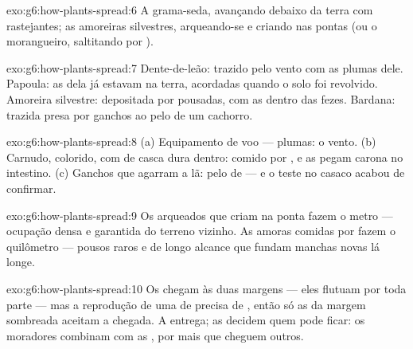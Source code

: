 \begin{solution}{exo:g6:how-plants-spread:6}
A grama-seda, avançando debaixo da terra com  rastejantes; as
amoreiras silvestres, arqueando-se e criando  nas pontas (ou o
morangueiro, saltitando por ).
\end{solution}

\begin{solution}{exo:g6:how-plants-spread:7}
Dente-de-leão: trazido pelo vento com as plumas dele. Papoula: as
 dela já estavam na terra, acordadas quando o solo foi
revolvido. Amoreira silvestre: depositada por  pousadas, com as
 dentro das fezes. Bardana: trazida presa por ganchos ao pelo
de um cachorro.
\end{solution}

\begin{solution}{exo:g6:how-plants-spread:8}
(a) Equipamento de voo --- plumas: o vento. (b) Carnudo, colorido, com
 de casca dura dentro: comido por , e as 
pegam carona no intestino. (c) Ganchos que agarram a lã: pelo de
 --- e o teste no casaco acabou de confirmar.
\end{solution}

\begin{solution}{exo:g6:how-plants-spread:9}
Os  arqueados que criam  na ponta fazem o metro --- ocupação
densa e garantida do terreno vizinho. As amoras comidas por 
fazem o quilômetro --- pousos raros e de longo alcance que fundam
manchas novas lá longe.
\end{solution}

\begin{solution}{exo:g6:how-plants-spread:10}
Os  chegam às duas margens --- eles flutuam por toda parte ---
mas a reprodução de uma  de  precisa de , então só
as  da margem sombreada aceitam a chegada. A 
entrega; as  decidem quem pode ficar: os moradores combinam
com as , por mais que cheguem outros.
\end{solution}

